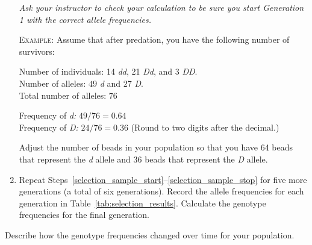 \documentclass[12pt]{exam}
\newcommand{\allele}[1]{\textit{#1}}
\begin{document}
\begin{questions}
\begin{enumerate}
	\textit{Ask your instructor to check your calculation to be sure you start Generation 1 with the correct allele frequencies.}
	
	\textsc{Example:} Assume that after predation, you have the following number of survivors:
	
	Number of individuals: 14 \allele{dd}, 21 \allele{Dd}, and 3 \allele{DD}.\\
	Number of alleles: $49$ \allele{d} and $27$ \allele{D}.\\
	Total number of alleles: $76$

	Frequency of \allele{d:} $49/76 = 0.64$\\
	Frequency of \allele{D:} $24/76 = 0.36$ (Round to two digits after the decimal.)

	Adjust the number of beads in your population so that you have 64 beads that represent the \allele{d} allele and 36 beads that represent the \allele{D} allele.  
	
	\item Repeat Steps~\ref{selection_sample_start}–\ref{selection_sample_stop} for five more generations (a total of six generations). Record the allele frequencies for each generation in Table~\ref{tab:selection_results}. Calculate the genotype frequencies for the final generation. 
	
\end{enumerate}

\question
Describe how the genotype frequencies changed over time for your population.

\newpage



\end{questions}
\end{document}
